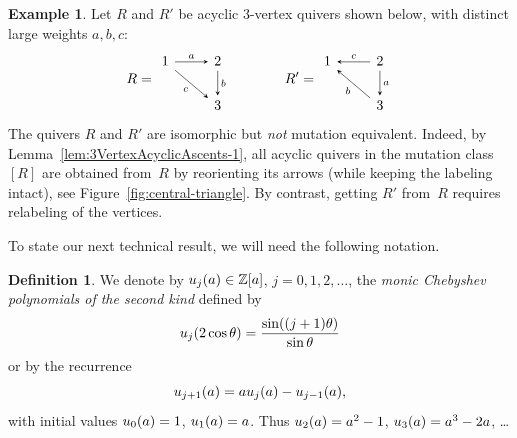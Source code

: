 \documentclass[11pt, letterpaper]{amsart}
\theoremstyle{definition}
\newtheorem{example}[theorem]{Example}
\newtheorem{definition}[theorem]{Definition}
\numberwithin{equation}{section}
\def\ZZ{{\mathbb Z}}
\begin{document}
\begin{example}
\label{eg:acyclicClasses}
Let $R$ and $R'$  be acyclic $3$-vertex quivers shown below, with distinct large weights $a,b,c$: 
\begin{equation}
\label{eq:RR'-3vertex}
R=\begin{tikzcd}[arrows={-stealth}]
  1 \arrow[r, "a"] 
  \arrow[rd, swap,"c"] 
  & 2 \arrow[d, "b" ] 
  \\
  & 3
\end{tikzcd}
\qquad\qquad
R'=\begin{tikzcd}[arrows={-stealth}]
  1 
  & 2 \arrow[d, "a" ] \arrow[l, swap, "c"] 
  \\
  & 3   \arrow[lu, "b"] 
\end{tikzcd}
\end{equation}
The quivers $R$ and $R'$ are isomorphic but \emph{not} mutation equivalent. 
Indeed, by Lemma~\ref{lem:3VertexAcyclicAscents-1}, 
all acyclic quivers in the mutation class $[R]$ are obtained from~$R$ by reorienting its arrows
(while keeping the labeling intact), see Figure~\ref{fig:central-triangle}. 
By contrast, getting $R'$ from~$R$ requires relabeling of the vertices. 
\end{example}

To state our next technical result, we will need the following notation.

\begin{definition}
\label{def:chebyshev-poly}
We denote by $\h_j(a)\in\ZZ[a]$, $j=0,1,2,\dots$, the \emph{monic Chebyshev polynomials of the second kind}
defined by 
\begin{equation*}
u_j(2\cos\theta)=\frac{\sin((j+1)\theta)}{\sin\theta}
\end{equation*}
or by the recurrence 
\begin{equation}
\label{eq:chebyshev-rec}
u_{j+1}(a)=au_j(a)-u_{j-1}(a), 
\end{equation}
with initial values $u_0(a)=1$, $u_1(a)=a$. 
Thus %
$u_2(a)=a^2-1$, $u_3(a)=a^3-2a$, \dots
\end{definition}
\end{document}
